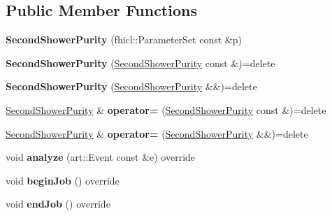 \subsection*{Public Member Functions}
\begin{DoxyCompactItemize}
\item 
{\bfseries Second\+Shower\+Purity} (fhicl\+::\+Parameter\+Set const \&p)\hypertarget{classSecondShowerPurity_a71eca6026bbad15c88a48b34137c3c9a}{}\label{classSecondShowerPurity_a71eca6026bbad15c88a48b34137c3c9a}

\item 
{\bfseries Second\+Shower\+Purity} (\hyperlink{classSecondShowerPurity}{Second\+Shower\+Purity} const \&)=delete\hypertarget{classSecondShowerPurity_ac179e01d4ca5cc86bdbe60a96b7c77f6}{}\label{classSecondShowerPurity_ac179e01d4ca5cc86bdbe60a96b7c77f6}

\item 
{\bfseries Second\+Shower\+Purity} (\hyperlink{classSecondShowerPurity}{Second\+Shower\+Purity} \&\&)=delete\hypertarget{classSecondShowerPurity_a84a772f635474b23f01ff0a9310a17ec}{}\label{classSecondShowerPurity_a84a772f635474b23f01ff0a9310a17ec}

\item 
\hyperlink{classSecondShowerPurity}{Second\+Shower\+Purity} \& {\bfseries operator=} (\hyperlink{classSecondShowerPurity}{Second\+Shower\+Purity} const \&)=delete\hypertarget{classSecondShowerPurity_a4eb7919d85a8756fe432dddd9061ea85}{}\label{classSecondShowerPurity_a4eb7919d85a8756fe432dddd9061ea85}

\item 
\hyperlink{classSecondShowerPurity}{Second\+Shower\+Purity} \& {\bfseries operator=} (\hyperlink{classSecondShowerPurity}{Second\+Shower\+Purity} \&\&)=delete\hypertarget{classSecondShowerPurity_a6235a3f18b7a78b19a05047c644e31e4}{}\label{classSecondShowerPurity_a6235a3f18b7a78b19a05047c644e31e4}

\item 
void {\bfseries analyze} (art\+::\+Event const \&e) override\hypertarget{classSecondShowerPurity_a3850d9497262ed256e5a7476d3982725}{}\label{classSecondShowerPurity_a3850d9497262ed256e5a7476d3982725}

\item 
void {\bfseries begin\+Job} () override\hypertarget{classSecondShowerPurity_a452d497e9edfaa2576a3b5a0540a22a8}{}\label{classSecondShowerPurity_a452d497e9edfaa2576a3b5a0540a22a8}

\item 
void {\bfseries end\+Job} () override\hypertarget{classSecondShowerPurity_abf54dcc8e9113033b779484072ae1780}{}\label{classSecondShowerPurity_abf54dcc8e9113033b779484072ae1780}

\end{DoxyCompactItemize}
